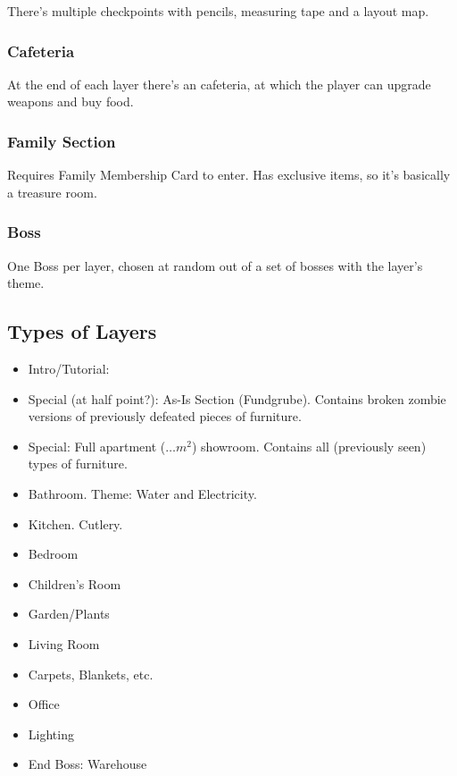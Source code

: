 \documentclass[a4paper]{article}
\theoremstyle{definition}
\theoremstyle{remark}
\begin{document}
There's multiple checkpoints with
pencils, measuring tape and a layout map.

\subsubsection{Cafeteria}

At the end of each layer there's an \ikea cafeteria,
at which the player can upgrade weapons and buy food.

\subsubsection{Family Section}

Requires \ikea Family Membership Card to enter.
Has exclusive items, so it's basically a treasure room.

\subsubsection{Boss}

One Boss per layer, chosen at random out of a set of bosses with the
layer's theme.

\subsection{Types of Layers}

\begin{itemize}
  \item Intro/Tutorial: \smaland
  \item Special (at half point?): As-Is Section (Fundgrube).
    Contains broken zombie versions of previously defeated pieces of
    furniture.
  \item Special: Full apartment ($\dots m^2$) showroom.
    Contains all (previously seen) types of furniture.
  \item Bathroom.
    Theme: Water and Electricity.
  \item Kitchen.
    Cutlery.
  \item Bedroom
  \item Children's Room
  \item Garden/Plants
  \item Living Room
  \item Carpets, Blankets, etc.
  \item Office
  \item Lighting
  \item End Boss: Warehouse
\end{itemize}
\end{document}
